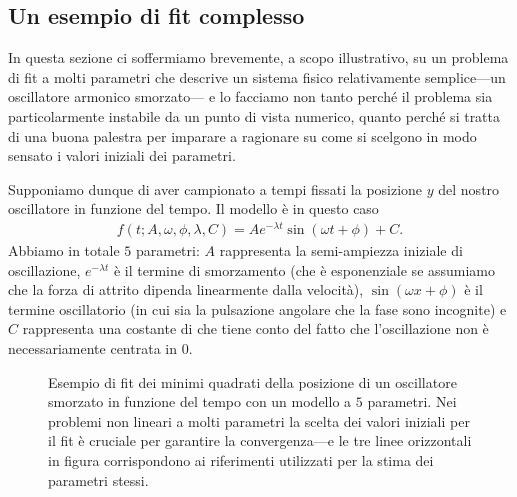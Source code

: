 \subsection{Un esempio di fit complesso}

In questa sezione ci soffermiamo brevemente, a scopo illustrativo, su un
problema di fit a molti parametri che descrive un sistema fisico
relativamente semplice---un oscillatore armonico smorzato--- e lo facciamo non
tanto perché il problema sia particolarmente instabile da un punto di vista
numerico, quanto perché si tratta di una buona palestra per imparare a
ragionare su come si scelgono in modo sensato i valori iniziali dei parametri.

Supponiamo dunque di aver campionato a tempi fissati la posizione $y$ del nostro
oscillatore in funzione del tempo. Il modello è in questo caso
\begin{align}\label{eq:fit_pendolo_smorzato}
  f(t; A, \omega, \phi, \lambda, C) =
  A e^{-\lambda t}\sin(\omega t + \phi) + C.
\end{align}
Abbiamo in totale $5$ parametri: $A$ rappresenta la semi-ampiezza iniziale di
oscillazione, $e^{-\lambda t}$ è il termine di smorzamento (che è esponenziale
se assumiamo che la forza di attrito dipenda linearmente dalla velocità),
$\sin(\omega x + \phi)$ è il termine oscillatorio (in cui sia la pulsazione
angolare che la fase sono incognite) e $C$ rappresenta una costante di
 che tiene conto del fatto che l'oscillazione non è
necessariamente centrata in $0$.

\begin{figure}[htbp]
  
  \caption{Esempio di fit dei minimi quadrati della posizione di
    un oscillatore smorzato in funzione del tempo con un modello a $5$
    parametri. Nei problemi non lineari a molti parametri la scelta dei
    valori iniziali per il fit è cruciale per garantire la
    convergenza---e le tre linee orizzontali in figura corrispondono ai
    riferimenti utilizzati per la stima dei parametri stessi.}
  \label{fig:fit_pendolo_smorzato}
\end{figure}

